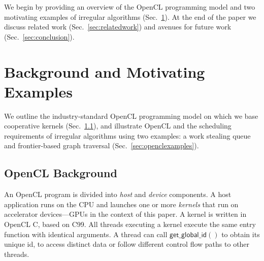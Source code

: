 \documentclass[numbers,nocopyrightspace,10pt]{sigplanconf}
\newcommand{\mysec}{Sec.~}
\newcommand{\getglobalid}{\mathsf{get\_global\_id}}
\begin{document}
We begin by providing an overview of the OpenCL programming model and
two motivating examples of irregular algorithms (\mysec\ref{sec:background}).  At the end of the paper we discuss related work (\mysec\ref{sec:relatedwork}) and avenues for future work (\mysec\ref{sec:conclusion}).

\section{Background and Motivating Examples}\label{sec:background}

We outline the industry-standard OpenCL programming model on which we
base cooperative kernels (\mysec\ref{sec:opencl}), and illustrate
OpenCL and the scheduling requirements of irregular algorithms using two examples: a work stealing queue and frontier-based graph traversal
(\mysec\ref{sec:openclexamples}).

\subsection{OpenCL Background}\label{sec:opencl}



An OpenCL program is divided into \emph{host} and \emph{device}
components.  A host application runs on the CPU and launches one or
more \emph{kernels} that run on accelerator devices---GPUs in the
context of this paper.  A kernel is written in OpenCL C, based on C99.
All threads executing a kernel execute the same entry function with
identical arguments.  A thread can call $\getglobalid()$
to obtain its unique id, to access distinct data or follow different control flow paths to other threads.
\end{document}
